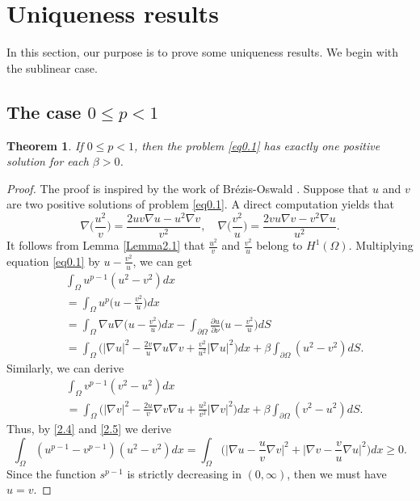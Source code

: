 \documentclass[12pt,reqno]{amsart}
\numberwithin{equation}{section}
\newtheorem{theorem}{Theorem}[section]
\theoremstyle{definition}
\begin{document}
\section{Uniqueness results}

In this section, our purpose is to prove some uniqueness results. We begin with the sublinear case.

\subsection{The case $0\le p<1$}  

\begin{theorem}\label{Theorem2.4}
If $0\le p<1$, then the problem \eqref{eq0.1} has exactly one positive solution for each $\beta>0$.
\end{theorem}

\begin{proof}
The proof is inspired by the work of Br\'ezis-Oswald \cite{BO}. Suppose that $u$ and $v$ are two positive solutions of problem \eqref{eq0.1}.
A direct computation yields that 
$$
\nabla \Big(\frac{u^2}{v}\Big)=\frac{2uv\nabla u-u^2\nabla v}{v^2},\quad \nabla \Big(\frac{v^2}{u}\Big)=\frac{2vu\nabla v-v^2\nabla u}{u^2}.
$$
It follows from Lemma \ref{Lemma2.1} that 
$\frac{u^2}{v}$ and $\frac{v^2}{u}$ belong to $H^1(\Omega)$. Multiplying equation \eqref{eq0.1} by $u-\frac{v^2}{u}$, we can get 
\begin{align}\label{2.4}
&\int_{\Omega}u^{p-1}(u^2-v^2)dx\nonumber\\
&=\int_{\Omega}u^{p}\Big(u-\frac{v^2}{u}\Big)dx \nonumber\\
&=\int_{\Omega}\nabla u\nabla \Big(u-\frac{v^2}{u} \Big)dx-\int_{\partial\Omega}\frac{\partial u}{\partial \nu}\Big(u-\frac{v^2}{u} \Big)dS\nonumber\\
&=\int_{\Omega}\Big(|\nabla u|^2-\frac{2v}{u}\nabla u\nabla v+\frac{v^2}{u^2}|\nabla u|^2 \Big)dx+\beta\int_{\partial\Omega}(u^2-v^2)dS.
\end{align}
Similarly, we can derive 
\begin{align}\label{2.5}
&\int_{\Omega}v^{p-1}(v^2-u^2)dx\nonumber\\
&=\int_{\Omega}\Big(|\nabla v|^2-\frac{2u}{v}\nabla v\nabla u+\frac{u^2}{v^2}|\nabla v|^2 \Big)dx+\beta\int_{\partial\Omega}(v^2-u^2)dS.
\end{align}
Thus, by \eqref{2.4} and \eqref{2.5} we derive 
\begin{equation*}
\int_{\Omega}(u^{p-1}-v^{p-1})(u^2-v^2)dx=\int_{\Omega}\Big(\Big|\nabla u-\frac{u}{v}\nabla v|^2+\Big|\nabla v-\frac{v}{u}\nabla u\Big|^2\Big)dx\ge 0.
\end{equation*}
Since the function $s^{p-1}$ is strictly decreasing in $(0,\infty)$, then we must have $u=v$.
\end{proof}
\end{document}
